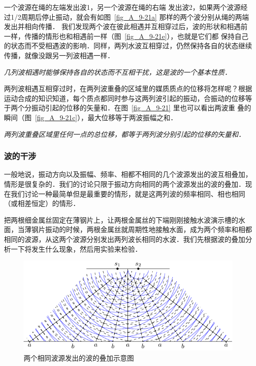 一个波源在绳的左端发出波1，另一个波源在绳的右端
发出波2，如果两个波源经过1/2周期后停止振动，就会有如图~\ref{fig_A_9-21a} 那样的两个波分别从绳的两端发出并相向传播．
我们发现两个波在彼此相遇并互相穿过后，波的形状和相遇前一样，传播的情形也和相遇前一样（图~\ref{fig_A_9-21e}），也就是它们都
保持自己的状态而不受相遇波的影响．同样，两列水波互相穿过，仍然保持各自的状态继续传播，就像没跟另一列波相遇一样．

\textit{几列波相遇时能够保持各自的状态而不互相干扰，这是波的一个基本性质．}

两列波相遇互相穿过时，在两列波重叠的区域里的媒质质点的位移将怎样呢？根据运动合成的知识知道，每个质点都同时参与这两列波引起的振动，合振动的位移等于两个分振动引起的位移的矢量和．在图~\ref{fig_A_9-21} 里也可以看出两波重
叠的瞬间（图~\ref{fig_A_9-21c}），最大位移等于两波振幅之和．

\textit{两列波重叠区域里任何一点的总位移，都等于两列波分别引起的位移的矢量和．}

\subsubsection{波的干涉} 

一般地说，振动方向以及振幅、频率、相都不相同的几个波源发出的波互相叠加，情形是很复杂的．我们的讨论只限于振动方向相同的两个波源发出的波的叠加．现在我们讨论一种最简单但是最重要的情形，就是这两列波的频率相同、相也相同（或相差恒定）的情形．

把两根细金属丝固定在薄钢片上，让两根金属丝的下端刚刚接触水波演示槽的水面，当薄钢片振动的时候，两根金属丝就周期性地接触水面，成为两个频率和相都相同的波源，从这两个波源分别发出两列波长相同的水波．我们先根据波的叠加分析一下将发生什么现象，然后用实验来检验．
\begin{figure}[htbp]
    \centering
    \includegraphics{fig/A/9-22.pdf}
    \caption{两个相同波源发出的波的叠加示意图}\label{fig_A_9-22}
\end{figure}

